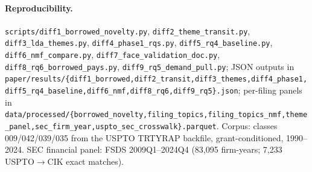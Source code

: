 \documentclass[11pt]{article}
\begin{document}
\paragraph{Reproducibility.} \texttt{scripts/diff1\_borrowed\_novelty.py},
\texttt{diff2\_theme\_transit.py}, \texttt{diff3\_lda\_themes.py},
\texttt{diff4\_phase1\_rqs.py}, \texttt{diff5\_rq4\_baseline.py},
\texttt{diff6\_nmf\_compare.py}, \texttt{diff7\_face\_validation\_doc.py},
\texttt{diff8\_rq6\_borrowed\_pays.py}, \texttt{diff9\_rq5\_demand\_pull.py};
JSON outputs in
\texttt{paper/results/\{diff1\_borrowed,diff2\_transit,diff3\_themes,diff4\_phase1,diff5\_rq4\_baseline,diff6\_nmf,diff8\_rq6,diff9\_rq5\}.json};
per-filing panels in
\texttt{data/processed/\{borrowed\_novelty,filing\_topics,filing\_topics\_nmf,theme\_panel,sec\_firm\_year,uspto\_sec\_crosswalk\}.parquet}.
Corpus: classes 009/042/039/035 from the USPTO TRTYRAP backfile,
grant-conditioned, 1990--2024. SEC financial panel: FSDS 2009Q1--2024Q4
(83{,}095 firm-years; 7{,}233 USPTO$\to$CIK exact matches).
\end{document}
